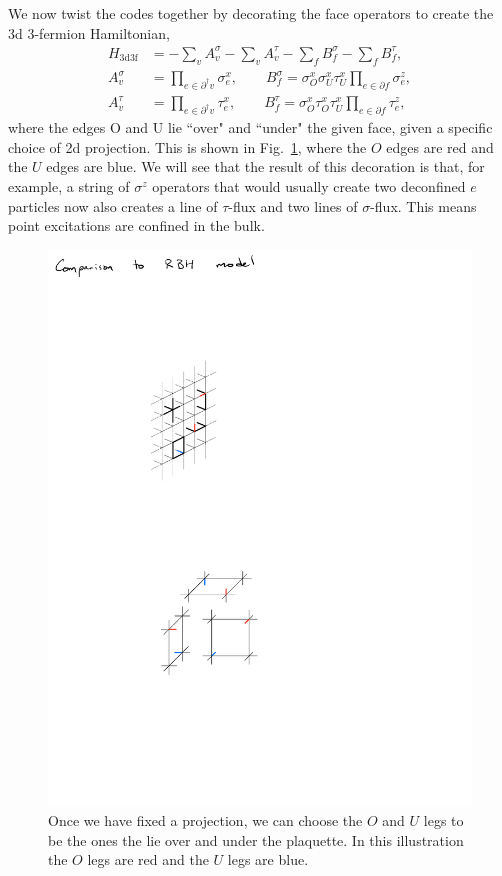 \documentclass[twocolumn, longbibliography]{revtex4-2}
\newcommand{\nn}{\nonumber\\}
\newcommand{\tdtf}{\text{3d3f}}
\newcommand{\pardag}{\partial^\dagger\!}
\begin{document}
We now twist the codes together by decorating the face operators to create the 3d 3-fermion Hamiltonian,
\begin{align}
H_{\tdtf} &= -\sum_vA_v^{\sigma}-\sum_vA_v^{\tau}-\sum_fB_f^{\sigma}-\sum_fB_f^{\tau},\nn
A_v^{\sigma} &= \prod_{e\in \pardag v}\sigma_e^x, \qquad B_f^{\sigma} = \sigma_O^x\sigma_U^x\tau_U^x\prod_{e\in\partial f}\sigma_e^z,\nn
A_v^{\tau} &= \prod_{e\in \pardag v}\tau_e^x, \qquad B_f^{\tau} = \sigma^x_O\tau^x_O\tau^x_U\prod_{e\in\partial f}\tau_e^z, \label{eqn:3d3f}
\end{align}
where the edges O and U lie ``over" and ``under" the given face, given a specific choice of 2d projection. This is shown in Fig.~\ref{fig:legs}, where the $O$ edges are red and the $U$ edges are blue. We will see that the result of this decoration is that, for example, a string of $\sigma^z$ operators that would usually create two deconfined $e$ particles now also creates a line of $\tau$-flux and two lines of $\sigma$-flux. This means point excitations are confined in the bulk.
	
\begin{figure}
\centering
\includegraphics[width=\linewidth]{legs}
\caption{Once we have fixed a projection, we can choose the $O$ and $U$ legs to be the ones the lie over and under the plaquette. In this illustration the $O$ legs are red and the $U$ legs are blue.}
\label{fig:legs}
\end{figure}
\end{document}
